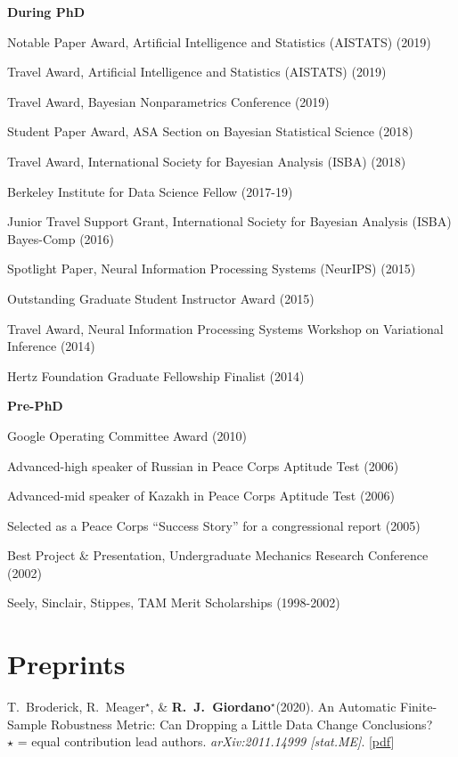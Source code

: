 \documentclass[margin,line]{res}
\newenvironment{list1}{
  \begin{list}{\ding{113}}{%
      \setlength{\itemsep}{0in}
      \setlength{\parsep}{0in} \setlength{\parskip}{0in}
      \setlength{\topsep}{0in} \setlength{\partopsep}{0in}
      \setlength{\leftmargin}{0in}}}{\end{list}} %
\newcommand{\mestar}{\textbf{R.~J.~Giordano}$^{\star}$\xspace}
\newcommand{\tamara}{T.~Broderick\xspace}
\newcommand{\paperref}[1]{[\href{#1}{pdf}]}
\newcommand{\paperref}[1]{}
\begin{document}
\begin{resume}
\textbf{During PhD}
\begin{list1}
\item[] Notable Paper Award, Artificial Intelligence and Statistics (AISTATS) (2019)
\item[] Travel Award, Artificial Intelligence and Statistics (AISTATS) (2019)
\item[] Travel Award, Bayesian Nonparametrics Conference (2019)
\item[] Student Paper Award, ASA Section on Bayesian Statistical Science (2018)
\item[] Travel Award, International Society for Bayesian Analysis (ISBA) (2018)
\item[] Berkeley Institute for Data Science Fellow (2017-19)
\item[] Junior Travel Support Grant, International Society for Bayesian Analysis (ISBA) Bayes-Comp (2016)
\item[] Spotlight Paper, Neural Information Processing Systems (NeurIPS) (2015)
\item[] Outstanding Graduate Student Instructor Award (2015)
\item[] Travel Award, Neural Information Processing Systems Workshop on Variational Inference (2014)
\item[] Hertz Foundation Graduate Fellowship Finalist (2014)
\end{list1}

\textbf{Pre-PhD}
\begin{list1}
\item[] Google Operating Committee Award (2010)
\item[] Advanced-high speaker of Russian in Peace Corps Aptitude Test (2006)
\item[] Advanced-mid speaker of Kazakh in Peace Corps Aptitude Test (2006)
\item[] Selected as a Peace Corps ``Success Story'' for a congressional report (2005)
\item[] Best Project \& Presentation, Undergraduate Mechanics Research Conference (2002)
\item[] Seely, Sinclair, Stippes, TAM Merit Scholarships (1998-2002)
\end{list1}

\pagebreak

\section{\sc Preprints}

\tamara, R.~Meager$^\star$, \& \mestar (2020).
An Automatic Finite-Sample Robustness Metric: Can Dropping a Little Data Change Conclusions?\\
$\star$ = equal contribution lead authors.
\emph{arXiv:2011.14999 [stat.ME]}.
\paperref{https://arxiv.org/abs/2011.14999}


\end{resume}
\end{document}

